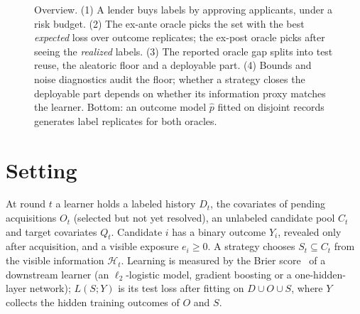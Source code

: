 \documentclass[runningheads]{llncs}
\begin{document}
\begin{figure}[t]
 \centering
 \resizebox{\linewidth}{!}{}
 \caption{Overview. (1) A lender buys labels by approving applicants, under a risk budget. (2) The ex-ante oracle picks the set with the best \emph{expected} loss over outcome replicates; the ex-post oracle picks after seeing the \emph{realized} labels. (3) The reported oracle gap splits into test reuse, the aleatoric floor and a deployable part. (4) Bounds and noise diagnostics audit the floor; whether a strategy closes the deployable part depends on whether its information proxy matches the learner. Bottom: an outcome model $\hat p$ fitted on disjoint records generates label replicates for both oracles.}
 \label{fig:framework}
\end{figure}

\section{Setting}
\label{sec:setting}
At round $t$ a learner holds a labeled history $D_t$, the covariates of pending acquisitions $O_t$ (selected but not yet resolved), an unlabeled candidate pool $C_t$ and target covariates $Q_t$. Candidate $i$ has a binary outcome $Y_i$, revealed only after acquisition, and a visible exposure $e_i\ge0$. A strategy chooses $S_t\subseteq C_t$ from the visible information $\mathcal H_t$. Learning is measured by the Brier score~\cite{brier1950verification} of a downstream learner (an $\ell_2$-logistic model, gradient boosting or a one-hidden-layer network); $L(S;Y)$ is its test loss after fitting on $D\cup O\cup S$, where $Y$ collects the hidden training outcomes of $O$ and $S$.
\end{document}
